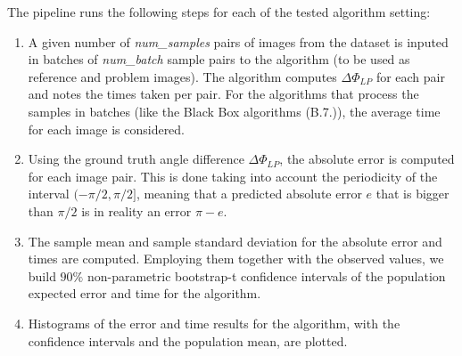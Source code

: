 \documentclass[11pt, a4paper, twoside]{article} %
\begin{document}
The pipeline runs the following steps for each of the tested algorithm setting:
\begin{enumerate}
\item A given number of {\em num\_samples} pairs of images from the dataset is inputed in batches of {\em num\_batch } sample pairs to the algorithm (to be used as reference and problem images). The algorithm computes $\Delta \Phi_{LP}$ for each pair and notes the times taken per pair. For the algorithms that process the samples in batches (like the Black Box algorithms (B.7.)), the average time for each image is considered.

\item Using the ground truth angle difference $\Delta \Phi_{LP}$, the absolute error is computed for each image pair. This is done taking into account the periodicity of the interval $(-\pi/2,\pi/2]$, meaning that a predicted absolute error $e$ that is bigger than $\pi/2$ is in reality an error $\pi-e$.

\item The sample mean and sample standard deviation for the absolute error and times are computed. Employing them together with the observed values, we build $90\%$ non-parametric bootstrap-t confidence intervals of the population expected error and time for the algorithm.

\item Histograms of the error and time results for the algorithm, with the confidence intervals and the population mean, are plotted.

\end{enumerate}
\end{document}
